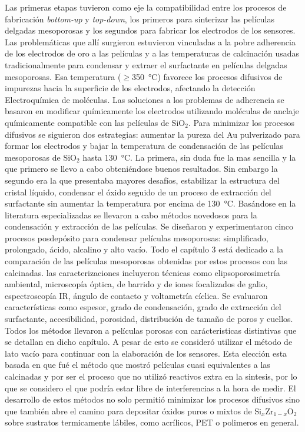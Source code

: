 Las primeras etapas tuvieron como eje la compatibilidad entre los procesos de fabricación \textit{bottom-up} y \textit{top-down}, los primeros para sinterizar las películas delgadas mesoporosas y los segundos para fabricar los electrodos de los sensores. Las problemáticas que allí surgieron estuvieron vinculadas a la pobre adherencia de los electrodos de oro a las películas y a las temperaturas de calcinación usadas tradicionalmente para condensar y extraer el surfactante en películas delgadas mesoporosas. Esa temperatura ($\geq$\SI{350}{\celsius}) favorece los procesos difusivos de impurezas hacia la superficie de los electrodos, afectando la detección Electroquímica de moléculas. Las soluciones a los problemas de adherencia se basaron en modificar químicamente los electrodos utilizando moléculas de anclaje químicamente compatible con las películas de SiO$_2$. Para minimizar los procesos difusivos se siguieron dos estrategias: aumentar la pureza del Au pulverizado para formar los electrodos y bajar la temperatura de condensación de las películas mesoporosas de SiO$_2$ hasta \SI{130}{\celsius}. La primera, sin duda fue la mas sencilla y la que primero se llevo a cabo obteniéndose buenos resultados. Sin embargo la segundo era la que presentaba mayores desafíos, estabilizar la estructura del cristal líquido, condensar el óxido seguido de un proceso de extracción del surfactante sin aumentar la temperatura por encima de \SI{130}{\celsius}. Basándose en la literatura especializadas se llevaron a cabo métodos novedosos para la condensación y extracción de las películas. Se diseñaron y experimentaron cinco procesos posdepósito para condensar películas mesoporosas: simplificado, prolongado, ácido, alcalino y alto vacío. Todo el capítulo 3 está dedicado a la comparación de las películas mesoporosas obtenidas por estos procesos con las calcinadas. las caracterizaciones incluyeron técnicas como elipsoporosimetría ambiental, microscopía óptica, de barrido y de iones focalizados de galio, espectroscopía IR, ángulo de contacto y voltametría cíclica. Se evaluaron características como espesor, grado de condensación, grado de extracción del surfactante, accesibilidad, porosidad, distribución de tamaño de poros y cuellos. Todos los métodos llevaron a películas porosas con carácteristicas distintivas que se detallan en dicho capítulo. A pesar de esto se consideró utilizar el método de lato vacío para continuar con la elaboración de los sensores. Esta elección esta basada en que fué el método que mostró películas cuasi equivalentes a las calcinadas y por ser el proceso que no utilizó reactivos extra en la sintesis, por lo que se considero el que podría estar libre de interferencias a la hora de medir. El desarrollo de estos métodos no solo permitió minimizar los procesos difusivos sino que también abre el camino para depositar óxidos puros o mixtos de Si$_x$Zr$_{1-x}$O$_2$ sobre sustratos termicamente lábiles, como acrílicos, PET o polimeros en general.

